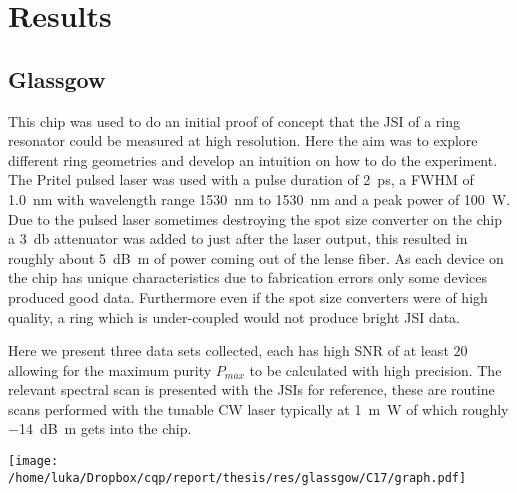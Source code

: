 \newpage
\section{Results}
\subsection{Glassgow}
This chip was used to do an initial proof of concept that the JSI of a ring resonator could be measured at high resolution. Here the aim was to explore different ring geometries and develop an intuition on how to do the experiment. The Pritel pulsed laser was used with a pulse duration of \SI{2}{\pico\second}, a FWHM of \SI{1.0}{\nano\meter} with wavelength range \SI{1530}{\nano\meter} to \SI{1530}{\nano\meter} and a peak power of \SI{100}{\watt}. Due to the pulsed laser sometimes destroying the spot size converter on the chip a \SI{3}{\decibel} attenuator was added to just after the laser output, this resulted in roughly about \SI{5}{\deci\bel\m} of power coming out of the lense fiber.
As each device on the chip has unique characteristics due to fabrication errors only some devices produced good data. Furthermore even if the spot size converters were of high quality, a ring which is under-coupled would not produce bright JSI data.

Here we present three data sets collected, each has high SNR of at least $20$ allowing for the maximum purity $P_{max}$ to be calculated with high precision. The relevant spectral scan is presented with the JSIs for reference, these are routine scans performed with the tunable CW laser typically at \SI{1}{\m\watt} of which roughly \SI{-14}{\deci\bel\m} gets into the chip. 

\begingroup
    \centering  
    \texttt{[image: /home/luka/Dropbox/cqp/report/thesis/res/glassgow/C17/graph.pdf]}
     \vspace{3pt} \label{c17_jsi}
\endgroup

